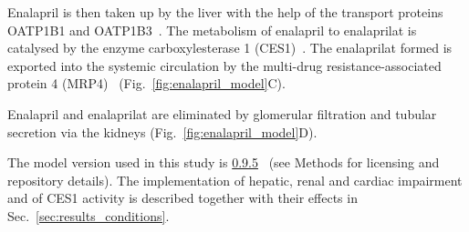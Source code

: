 \documentclass[pharmaceutics,article,submit,pdftex,moreauthors]{Definitions/mdpi}
\begin{document}
Enalapril is then taken up by the liver with the help of the transport proteins OATP1B1 and OATP1B3~\cite{Liu2006a}. The metabolism of enalapril to enalaprilat is catalysed by the enzyme carboxylesterase 1 (CES1)~\cite{Thomsen2014}. The enalaprilat formed is exported into the systemic circulation by the multi-drug resistance-associated protein 4 (MRP4)~\cite{Ferslew2014} (Fig.~\ref{fig:enalapril_model}C). 

Enalapril and enalaprilat are eliminated by glomerular filtration and tubular secretion via the kidneys (Fig.~\ref{fig:enalapril_model}D).

The model version used in this study is \href{https://zenodo.org/doi/10.5281/zenodo.11067564}{0.9.5}~\cite{enalapril-model-v0.9.5} (see Methods for licensing and repository details). The implementation of hepatic, renal and cardiac impairment and of CES1 activity is described together with their effects in Sec.~\ref{sec:results_conditions}.





\end{document}
